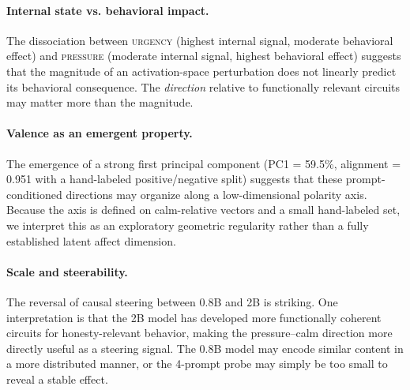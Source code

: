 \documentclass[11pt,a4paper]{article}
\begin{document}
\paragraph{Internal state vs. behavioral impact.}
The dissociation between \textsc{urgency} (highest internal signal, moderate behavioral effect) and \textsc{pressure} (moderate internal signal, highest behavioral effect) suggests that the magnitude of an activation-space perturbation does not linearly predict its behavioral consequence. The \emph{direction} relative to functionally relevant circuits may matter more than the magnitude.

\paragraph{Valence as an emergent property.}
The emergence of a strong first principal component (PC1 = 59.5\%, alignment = 0.951 with a hand-labeled positive/negative split) suggests that these prompt-conditioned directions may organize along a low-dimensional polarity axis. Because the axis is defined on calm-relative vectors and a small hand-labeled set, we interpret this as an exploratory geometric regularity rather than a fully established latent affect dimension.

\paragraph{Scale and steerability.}
The reversal of causal steering between 0.8B and 2B is striking. One interpretation is that the 2B model has developed more functionally coherent circuits for honesty-relevant behavior, making the pressure--calm direction more directly useful as a steering signal. The 0.8B model may encode similar content in a more distributed manner, or the 4-prompt probe may simply be too small to reveal a stable effect.
\end{document}
